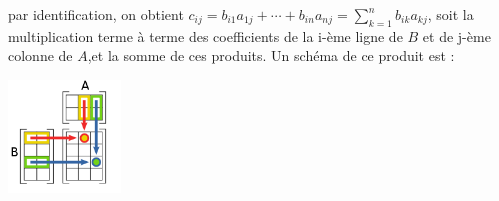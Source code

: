 \documentclass{book}
\begin{document}
par identification, on obtient $c_{ij}=b_{i1}a_{1j}+\cdots +b_{in}a_{nj}=\sum _{k=1}^{n}b_{ik}a_{kj}$, soit la multiplication terme à terme des coefficients de la  i-ème ligne de $B$ et de j-ème colonne de $A$,et la somme de ces produits. Un schéma de ce produit est :  
\begin{center}
\includegraphics[width=3cm]{product_matriciel.png}
\end{center}
%
%
\end{document}
